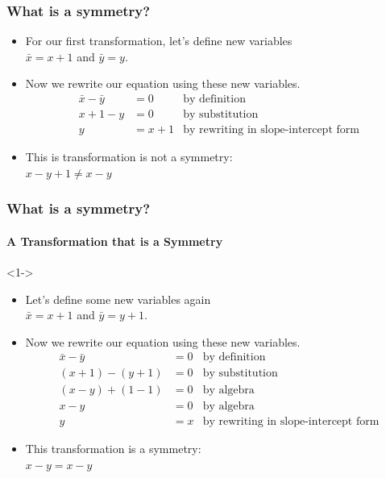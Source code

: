 \documentclass{beamer}
\begin{document}
\begin{frame}
    \frametitle{What is a symmetry?}
    \begin{example}
        \begin{itemize}
            \item For our first transformation, let's define new variables\\ $\bar{x}=x+1$ and $\bar{y}=y$.
            \item Now we rewrite our equation using these new variables. \begin{equation*}
                \begin{aligned}
                    \bar{x}-\bar{y} &= 0 & \text{by definition} \\
                    x+1-y &= 0 & \text{by substitution} \\
                    y &= x+1 & \text{by rewriting in slope-intercept form}
                \end{aligned}
            \end{equation*}
            \item This is transformation is not a symmetry: \\ $x-y+1\ne x-y$
        \end{itemize}        
    \end{example}
\end{frame}


\begin{frame}
    \frametitle{What is a symmetry?}
    \framesubtitle{A Transformation that is a Symmetry}
    \begin{example}[2]<1->
        \begin{itemize}
            \item Let's define some new variables again\\ $\bar{x}=x+1$ and $\bar{y}=y+1$.
            \item Now we rewrite our equation using these new variables. \begin{equation*}
                \begin{aligned}
                    \bar{x}-\bar{y} &= 0 & \text{by definition} \\
                    (x+1)-(y+1) &= 0 & \text{by substitution} \\
                    (x-y)+(1-1) &= 0 & \text{by algebra} \\
                    x-y &= 0 & \text{by algebra} \\
                    y &= x & \text{by rewriting in slope-intercept form}
                \end{aligned}
            \end{equation*}
            \item This transformation is a symmetry: \\ $x-y = x-y$
        \end{itemize}        
    \end{example}
\end{frame}
\end{document}
